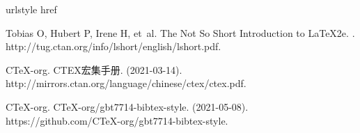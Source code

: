 \begin{thebibliography}{3}
\providecommand{\natexlab}[1]{#1}
\providecommand{\url}[1]{#1}
\expandafter\ifx\csname urlstyle\endcsname\relax\else
  \fi
\expandafter\ifx\csname href\endcsname\relax
  \DeclareUrlCommand{}
  \def\eprint#1#2{#2}
\else
  \def\doi#1{\href{https://doi.org/#1}{\nolinkurl{#1}}}
  \let\eprint\href
\fi

Tobias O, Hubert P, Irene H, et~al.
\newblock The Not So Short Introduction to LaTeX2e\allowbreak[EB/OL].
\allowbreak[2021-06-05].
\newblock \url{http://tug.ctan.org/info/lshort/english/lshort.pdf}.

{CTeX-org}.
\newblock CTEX宏集手册\allowbreak[EB/OL].
\newblock \allowbreak(2021-03-14)\allowbreak[2021-06-05].
\newblock \url{http://mirrors.ctan.org/language/chinese/ctex/ctex.pdf}.

{CTeX-org}.
\newblock CTeX-org/gbt7714-bibtex-style\allowbreak[CP/OL].
\newblock \allowbreak(2021-05-08)\allowbreak[2021-06-05].
\newblock \url{https://github.com/CTeX-org/gbt7714-bibtex-style}.

\end{thebibliography}
